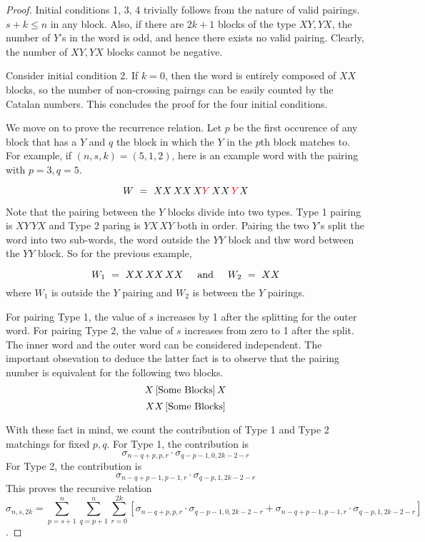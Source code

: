 \documentclass{article}
\newcommand{\textAnd}{
    {
        \hspace{5mm}
        \textrm{and}
        \hspace{5mm}
    }
}
\begin{document}
\begin{proof}
    Initial conditions 1, 3, 4 trivially follows from the nature of 
    valid pairings. $s + k \leq n$ in any block. Also, if there are 
    $2k + 1$ blocks of the type $XY, YX$, the number of $Y$'s in the 
    word is odd, and hence there exists no valid pairing. Clearly, 
    the number of $XY, YX$ blocks cannot be negative. 

    Consider initial condition 2. If $k = 0$, then the word is entirely 
    composed of $XX$ blocks, so the number of non-crossing pairngs can 
    be easily counted by the Catalan numbers. This concludes the proof 
    for the four initial conditions. 

    We move on to prove the recurrence relation. Let $p$ be the 
    first occurence of any block that has a $Y$ and $q$ the block in which 
    the $Y$ in the $p$th block matches to. For example, if $(n, s, k) = (5, 1, 2)$, 
    here is an example word with the pairing with $p = 3, q = 5$. 

    \newcommand{\red}[1]{\color{red} {#1} \color{black}}

    \[
    W \ = \
    XX \, XX \, X\red{Y} \, XX \, \red{Y}X
    \]

    Note that the pairing between the $Y$ blocks divide into two types. 
    Type 1 pairing is $XY \, YX$ and Type 2 paring is $YX \, XY$ both in order. 
    Pairing the two $Y$'s split the word into two sub-words, the word 
    outside the $YY$ block and thw word between the $YY$ block. So for the previous example, 

    \[
        W_1 \ = \ XX \, XX \, XX \textAnd W_2 \ = \  XX
    \]
    where $W_1$ is outside the $Y$ pairing and $W_2$ is between the $Y$ pairings. 

    For pairing Type 1, the value of $s$ increases by 1 after the splitting for 
    the outer word. For pairing Type 2, the value of $s$ increases from zero to 1 
    after the split. The inner word and the outer word can be considered 
    independent. The important obsevation to deduce the latter fact is to observe 
    that the pairing number is equivalent for the following two blocks. 
    \[
    X \, [\textnormal{Some Blocks}] \, X
    \]
 \[
    XX \, [\textnormal{Some Blocks}]
    \]

    With these fact in mind, we count the contribution of 
    Type 1 and Type 2 matchings for fixed $p, q$. 
    For Type 1, the contribution is 
    \[
    \sigma_{n - q + p, p, r} \cdot \sigma_{q - p - 1, 0, 2k - 2 - r}
    \]
    For Type 2, the contribution is 
    \[
\sigma_{n - q + p - 1, p - 1, r} \cdot \sigma_{q - p, 1, 2k - 2 - r}
    \]
    This proves the recursive relation 
\[
\sigma_{n, s, 2k} = 
\sum_{p = s + 1}^{n} 
\sum_{q = p + 1}^{n}
\sum_{r = 0}^{2k}
\left[
\sigma_{n - q + p, p, r} \cdot \sigma_{q - p - 1, 0, 2k - 2 - r}
+ 
\sigma_{n - q + p - 1, p - 1, r} \cdot \sigma_{q - p, 1, 2k - 2 - r}
\right]
\]. 
\end{proof}
\end{document}
